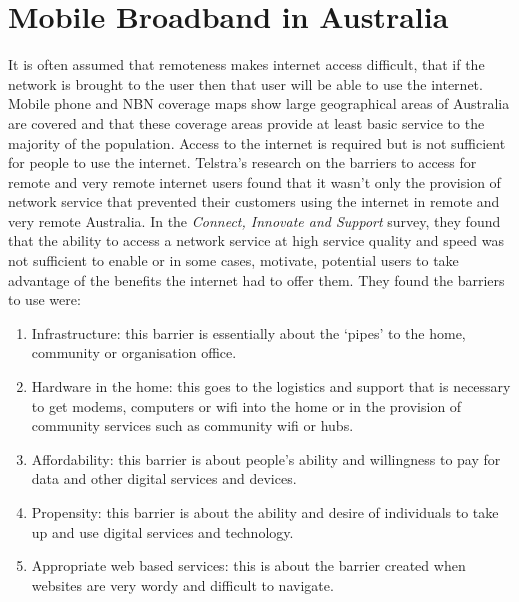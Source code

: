 \section{Mobile Broadband in Australia}

It is often assumed that remoteness makes internet access difficult, that if the network is brought to the user then that user will be able to use the internet. Mobile phone and NBN coverage maps show large geographical areas of Australia are covered and that these coverage areas provide at least basic service to the majority of the population. Access to the internet is required but is not sufficient for people to use the internet. Telstra's research on the barriers to access for remote and very remote internet users found that it wasn't only the provision of network service that prevented their customers using the internet in remote and very remote Australia. In the \textit{Connect, Innovate and Support}\cite{RefWorks:230} survey, they found that the ability to access a network service at high service quality and speed was not sufficient to enable or in some cases, motivate, potential users to take advantage of the benefits the internet had to offer them. They found the barriers to use were:

\begin{enumerate}
\item{Infrastructure:} this barrier is essentially about the `pipes' to
the home, community or organisation office.
\item{Hardware in the home:} this goes to the logistics and support
that is necessary to get modems, computers or wifi into the
home or in the provision of community services such as
community wifi or hubs.
\item{Affordability:} this barrier is about people's ability and willingness
to pay for data and other digital services and devices.
\item{Propensity:} this barrier is about the ability and desire of individuals
to take up and use digital services and technology.
\item{Appropriate web based services:} this is about the barrier
created when websites are very wordy and difficult to navigate\cite{RefWorks:230}.
\end{enumerate}

